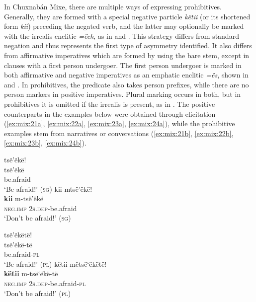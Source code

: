 \documentclass[output=paper,colorlinks,citecolor=brown,draft]{langscibook}
\begin{document}
In Chuxnabán Mixe, there are multiple ways of expressing prohibitives. Generally, they are formed with a special negative particle \textit{këtii} (or its shortened form \textit{kii}) preceding the negated verb, and the latter may optionally be marked with the irrealis enclitic \textit{=ëch}, as in  and . This strategy differs from standard negation and thus represents the first type of asymmetry identified. It also differs from affirmative imperatives which are formed by using the bare stem, except in clauses with a first person undergoer. The first person undergoer is marked in both affirmative and negative imperatives as an emphatic enclitic \textit{=ës}, shown in  and . In prohibitives, the predicate also takes person prefixes, while there are no person markers in positive imperatives. Plural marking occurs in both, but in prohibitives it is omitted if the irrealis is present, as in . The positive counterparts in the examples below were obtained through elicitation (\ref{ex:mix:21a}, \ref{ex:mix:22a}, \ref{ex:mix:23a}, \ref{ex:mix:24a}), while the prohibitive examples stem from narratives or conversations (\ref{ex:mix:21b}, \ref{ex:mix:22b}, \ref{ex:mix:23b}, \ref{ex:mix:24b}). 

\ea\label{ex:mix:21}
    \ea\label{ex:mix:21a}
        \glll tsë’ëkë! \\
              tsë’ëkë \\
              be.afraid\\
        \glt ‘Be afraid!’ (\textsc{sg}) 
    \ex\label{ex:mix:21b}
        \glll kii mtsë’ëkë!\\ 
              \textbf{kii} m-tsë’ëkë \\
              \textsc{neg.imp} \textsc{2s.dep}{}-be.afraid \\
        \glt ‘Don’t be afraid!’ (\textsc{sg})
    \z
\z 

\ea\label{ex:mix:22}
    \ea\label{ex:mix:22a}
        \glll tsë’ëkëtë! \\
              tsë’ëkë-të \\
              be.afraid-\textsc{pl} \\
        \glt ‘Be afraid!’ (\textsc{pl})
    \ex\label{ex:mix:22b}
        \glll këtii mëtsë‘ëkëtë!\\ 
              \textbf{këtii} m-tsë‘ëkë-të\\
              \textsc{neg.imp} \textsc{2s.dep}{}-be.afraid-\textsc{pl} \\
        \glt ‘Don’t be afraid!’ (\textsc{pl})
    \z
\z 
 
\end{document}
